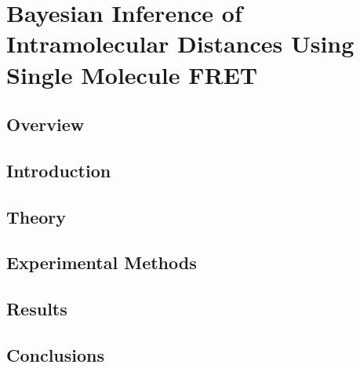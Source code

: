 \chapter{Bayesian Inference of Intramolecular Distances Using Single Molecule FRET}
\section{Overview}
\section{Introduction}
\section{Theory}
\section{Experimental Methods}
\section{Results}
\section{Conclusions}